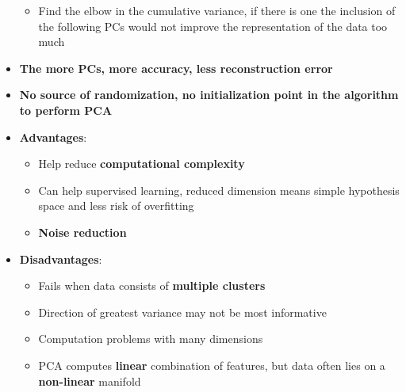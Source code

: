 \begin{itemize}
\begin{itemize}
            \item Find the elbow in the cumulative variance, if there is one the inclusion of the following PCs would not improve the representation of the data too much
        \end{itemize}
        \item \textbf{The more PCs, more accuracy, less reconstruction error}
        \item \textbf{No source of randomization, no initialization point in the algorithm to perform PCA}
        \item \textbf{Advantages}:
        \begin{itemize}
            \item Help reduce \textbf{computational complexity}
            \item Can help supervised learning, reduced dimension means simple hypothesis space and less risk of overfitting
            \item \textbf{Noise reduction}
        \end{itemize}
        \item \textbf{Disadvantages}:
        \begin{itemize}
            \item Fails when data consists of \textbf{multiple clusters}
            \item Direction of greatest variance may not be most informative
            \item Computation problems with many dimensions
            \item PCA computes \textbf{linear} combination of features, but data often lies on a \textbf{non-linear} manifold
        \end{itemize}
    \end{itemize}

